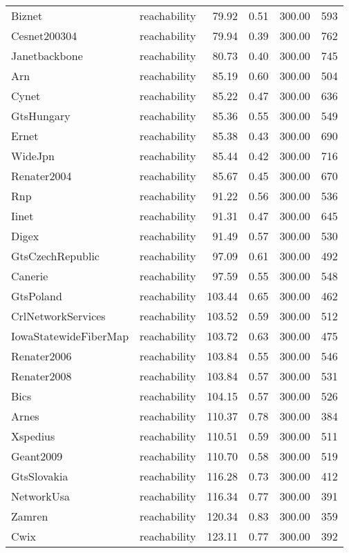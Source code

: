 \begin{tabular}{llrrrr}
Biznet & reachability & 79.92 & 0.51 & 300.00 & 593 \\
Cesnet200304 & reachability & 79.94 & 0.39 & 300.00 & 762 \\
Janetbackbone & reachability & 80.73 & 0.40 & 300.00 & 745 \\
Arn & reachability & 85.19 & 0.60 & 300.00 & 504 \\
Cynet & reachability & 85.22 & 0.47 & 300.00 & 636 \\
GtsHungary & reachability & 85.36 & 0.55 & 300.00 & 549 \\
Ernet & reachability & 85.38 & 0.43 & 300.00 & 690 \\
WideJpn & reachability & 85.44 & 0.42 & 300.00 & 716 \\
Renater2004 & reachability & 85.67 & 0.45 & 300.00 & 670 \\
Rnp & reachability & 91.22 & 0.56 & 300.00 & 536 \\
Iinet & reachability & 91.31 & 0.47 & 300.00 & 645 \\
Digex & reachability & 91.49 & 0.57 & 300.00 & 530 \\
GtsCzechRepublic & reachability & 97.09 & 0.61 & 300.00 & 492 \\
Canerie & reachability & 97.59 & 0.55 & 300.00 & 548 \\
GtsPoland & reachability & 103.44 & 0.65 & 300.00 & 462 \\
CrlNetworkServices & reachability & 103.52 & 0.59 & 300.00 & 512 \\
IowaStatewideFiberMap & reachability & 103.72 & 0.63 & 300.00 & 475 \\
Renater2006 & reachability & 103.84 & 0.55 & 300.00 & 546 \\
Renater2008 & reachability & 103.84 & 0.57 & 300.00 & 531 \\
Bics & reachability & 104.15 & 0.57 & 300.00 & 526 \\
Arnes & reachability & 110.37 & 0.78 & 300.00 & 384 \\
Xspedius & reachability & 110.51 & 0.59 & 300.00 & 511 \\
Geant2009 & reachability & 110.70 & 0.58 & 300.00 & 519 \\
GtsSlovakia & reachability & 116.28 & 0.73 & 300.00 & 412 \\
NetworkUsa & reachability & 116.34 & 0.77 & 300.00 & 391 \\
Zamren & reachability & 120.34 & 0.83 & 300.00 & 359 \\
Cwix & reachability & 123.11 & 0.77 & 300.00 & 392 \\

\end{tabular}
